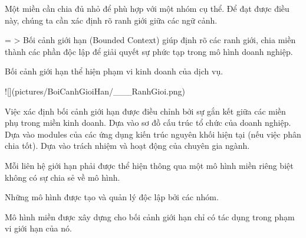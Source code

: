 
Một miền cần chia đủ nhỏ để phù hợp với một nhóm cụ thể. Để đạt được điều này, chúng ta cần xác định rõ ranh giới giữa các ngữ cảnh.

= > Bối cảnh giới hạn (Bounded Context) giúp định rõ các ranh giới, chia miền thành các phần độc lập để giải quyết sự phức tạp trong mô hình doanh nghiệp.

Bối cảnh giới hạn thể hiện phạm vi kinh doanh của dịch vụ.

![](pictures/BoiCanhGioiHan/___RanhGioi.png)


Việc xác định bối cảnh giới hạn được điều chỉnh bởi sự gắn kết giữa các miền phụ trong miền kinh doanh.
Dựa vào sơ đồ cấu trúc tổ chức của doanh nghiệp.
Dựa vào modules của các ứng dụng kiến trúc nguyên khối hiện tại (nếu việc phân chia tốt).
Dựa vào trách nhiệm và hoạt động của chuyên gia ngành.


Mỗi liên hệ giới hạn phải được thể hiện thông qua một mô hình miền riêng biệt không có sự chia sẻ về mô hình.


Những mô hình được tạo và quản lý độc lập bởi các nhóm.


Mô hình miền được xây dựng cho bối cảnh giới hạn chỉ có tác dụng trong phạm vi giới hạn của nó.


